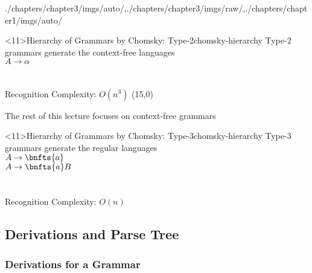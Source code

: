 \begin{graphicspathcontext}{{./chapters/chapter3/imgs/auto/},{./chapters/chapter3/imgs/raw/},{./chapters/chapter1/imgs/auto/}}
\begin{bibunit}[apalike]
\begin{rightlawnframe}<11>{{Hierarchy of Grammars} by Chomsky: Type-2}{chomsky-hierarchy}
	Type-2 grammars generate the context-free languages \\[.5cm]
	$A \rightarrow \alpha$ \\[.5cm]
	 \\[.5cm]
	 \\[.5cm]
	Recognition Complexity: $O(n^3)$
	\putat(15,0){\parbox{2.5cm}{\alert{The rest of this lecture focuses on context-free grammars}}}
\end{rightlawnframe}

\begin{rightlawnframe}<11>{{Hierarchy of Grammars} by Chomsky: Type-3}{chomsky-hierarchy}
	Type-3 grammars generate the regular languages \\[.5cm]
	$A \rightarrow \bnfts{a}$ \\
	$A \rightarrow \bnfts{a}B$\\[.5cm]
	 \\[.5cm]
	 \\[.5cm]
	Recognition Complexity: $O(n)$
\end{rightlawnframe}

\subsection{Derivations and Parse Tree}
\subsubsectiontableofcontentslide*

\subsubsection{Derivations for a Grammar}


\end{bibunit}
\end{graphicspathcontext}
